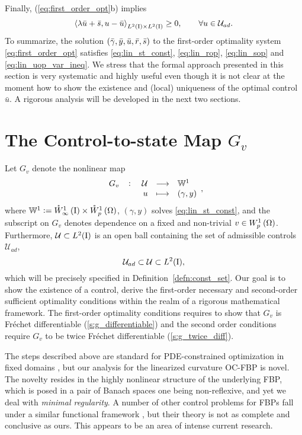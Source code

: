 \documentclass[final]{siamltex}
\begin{document}
Finally, (\ref{eq:first_order_opt}b) implies	
\begin{align} \label{eq:lin_uop_var_ineq}
   {{\mathop{{\left\langle {{\lambda {\bar{u}} + {\bar{s}}, u-{\bar{u}} }} \right\rangle}}}_{{{L^2\del{{{\text{\rm I}}}}}}\times{{L^2\del{{{\text{\rm I}}}}}}}} \geq 0, \qquad \forall u \in \mathcal{U}_{ad}.
\end{align}   
To summarize, the solution ${\del{{\bar{\gamma}},{\bar{y}},{\bar{u}},{\bar{r}},{\bar{s}}}}$ to the first-order optimality system \eqref{eq:first_order_opt}
satisfies \eqref{eq:lin_st_const}, \eqref{eq:lin_rop}, \eqref{eq:lin_sop} and \eqref{eq:lin_uop_var_ineq}. 
We stress that the formal approach presented in this section is very systematic and highly
useful even though it is not clear at the moment how to show the existence and (local) uniqueness of the optimal control
${\bar{u}}$.  A rigorous analysis will be developed in the next two sections.

\section{The Control-to-state Map $G_v$}
\label{s:g_map}
Let $G_v$ denote the nonlinear map
\begin{align}   \label{eq:cont_to_state}
    \fullfunction{G_v}{\mathcal{U}} {{\mathbb{W}}^1}
    {u}{\del{\gamma,y}},
\end{align}
where ${\mathbb{W}}^1 := {{\mathring{W}^{{1}}_{{\infty}}\del{{\text{\rm I}}}}}\times{{\mathring{W}^{{1}}_{{p}}\del{{\Omega}}}}$, $(\gamma,y)$ solves \eqref{eq:lin_st_const}, and the subscript on $G_v$ denotes dependence
on a fixed and non-trivial $v \in {{W^{{1}}_{{p}}\del{{\Omega}}}}$. Furthermore, 
${\mathcal{U}} \subset L^2({\text{\rm I}})$ is an open ball containing the set of admissible
controls ${{\mathcal{U}_{ad}}}$, 
\[
    {{\mathcal{U}_{ad}}} \subset {\mathcal{U}} \subset L^2({\text{\rm I}}), 
\]
which will be precisely specified in Definition~\ref{defn:const_set}.
Our goal is to show the existence of a control, derive the 
first-order necessary and second-order sufficient optimality conditions within the realm of a 
rigorous mathematical framework. The first-order optimality 
conditions requires to show  that $G_v$ is Fr\'echet differentiable (\autoref{s:g_differentiable}) 
and the second  order conditions require $G_v$ to be twice Fr\'echet differentiable 
(\autoref{s:g_twice_diff}).

The steps described above are standard for PDE-constrained optimization in fixed domains \cite{FTroltzsch_2010a}, but our analysis for the linearized curvature OC-FBP is novel. The novelty resides in the highly nonlinear structure of the underlying FBP, which is posed in a pair of Banach spaces one being non-reflexive, and yet we deal with \emph{minimal regularity}. 
A number of other control problems for FBPs fall under a similar functional framework \cite{MElliott_MHinze_VStyles_2007a, MElliott_YGiga_MHinze_VStyles_2010a}, but their theory is not as complete and conclusive as ours. This appears to be an area of intense current research.
\end{document}
